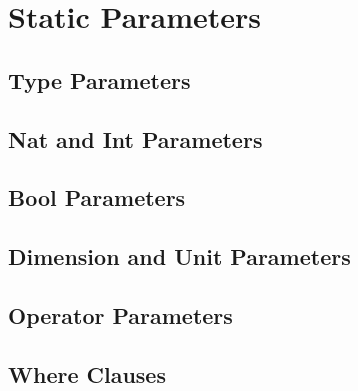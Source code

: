%
%
%
%

\chapter{Static Parameters}

\section{Type Parameters}
\section{Nat and Int Parameters}
\section{Bool Parameters}
\section{Dimension and Unit Parameters}
\section{Operator Parameters}
\section{Where Clauses}
